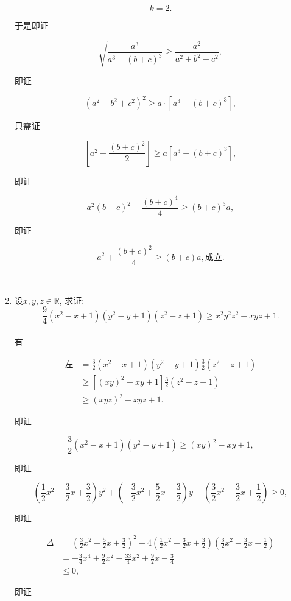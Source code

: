\documentclass[8pt]{article}
\begin{document}
\begin{enumerate}
			$$k=2.$$

			于是即证

			$$\sqrt{\frac{a^3}{a^3+(b+c)^3}}\geq\frac{a^2}{a^2+b^2+c^2},$$

			即证

			$$(a^2+b^2+c^2)^2\geq a\cdot[a^3+(b+c)^3],$$

			只需证

			$$\left[a^2+\frac{(b+c)^2}{2}\right]\geq a[a^3+(b+c)^3],$$

			即证

			$$a^2 (b+c)^2 + \frac{(b+c)^4}{4}\geq(b+c)^3 a,$$

			即证

			$$a^2 + \frac{(b+c)^2}{4} \geq (b+c)a, \text{成立}.$$

		~\\

		\item 设$x, y, z\in\mathbb{R}$, 求证: $$\frac{9}{4}(x^2-x+1)(y^2-y+1)(z^2-z+1)\geq x^2 y^2 z^2 - xyz + 1.$$
			~\\

			有

			\begin{align*}
				\text{左} &= \frac{3}{2}(x^2-x+1) (y^2-y+1) \frac{3}{2} (z^2-z+1)\\
				&\geq [(xy)^2-xy+1]\frac{3}{2}(z^2-z+1)\\
				&\geq (xyz)^2 - xyz + 1.
			\end{align*}

			即证

			$$\frac{3}{2}(x^2-x+1)(y^2-y+1)\geq(xy)^2-xy+1,$$

			即证

			$$\left(\frac{1}{2}x^2-\frac{3}{2}x+\frac{3}{2}\right) y^2 + \left(-\frac{3}{2}x^2 + \frac{5}{2}x - \frac{3}{2}\right) y + \left(\frac{3}{2}x^2 - \frac{3}{2} x + \frac{1}{2} \right) \geq 0,$$

			即证

			\begin{align*}
				\Delta &= \left(\frac{3}{2} x^2 - \frac{5}{2} x + \frac{3}{2} \right)^2 - 4\left(\frac{1}{2} x^2 - \frac{3}{2} x + \frac{3}{2} \right) \left(\frac{3}{2} x^2 - \frac{3}{2} x + \frac{1}{2} \right)\\
				&= -\frac{3}{4} x^4 + \frac{9}{2} x^2 - \frac{33}{4} x^2 + \frac{9}{2} x - \frac{3}{4}\\
				&\leq 0,
			\end{align*}

			即证


\end{enumerate}
\end{document}
